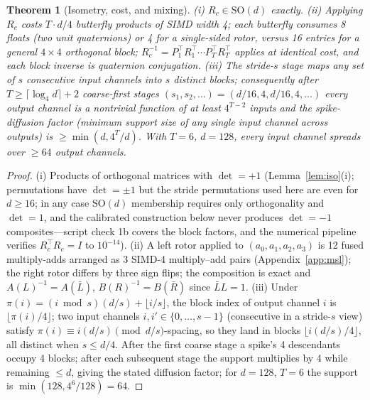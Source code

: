 \documentclass{article}
\newtheorem{theorem}{Theorem}
\newcommand{\SO}{\mathrm{SO}}
\begin{document}
\begin{theorem}[Isometry, cost, and mixing]
\label{thm:mixing}
(i) $R_c\in\SO(d)$ exactly. (ii) Applying $R_c$ costs $T\cdot d/4$ butterfly
products of SIMD width 4; each butterfly consumes 8 floats (two unit
quaternions) or 4 for a single-sided rotor, versus 16 entries for a general
$4\times4$ orthogonal block; $R_c^{-1}=P_1^\top R_1^\top\cdots P_T^\top R_T^\top$
applies at identical cost, and each block inverse is quaternion conjugation.
(iii) The stride-$s$ stage maps any set of $s$ consecutive input channels into
$s$ distinct blocks; consequently after
$T\ge\lceil\log_4 d\rceil+2$ coarse-first stages
$(s_1,s_2,\dots)=(d/16,4,d/16,4,\dots)$ every output channel is a
nontrivial function of at least $4^{T-2}$ inputs and the spike-diffusion
factor (minimum support size of any single input channel across outputs) is
$\ge\min(d,4^{T}/d)$. With $T=6$, $d=128$, every input channel spreads over
$\ge64$ output channels.
\end{theorem}

\begin{proof}
(i) Products of orthogonal matrices with $\det=+1$
(Lemma~\ref{lem:iso}(i); permutations have $\det=\pm1$ but the stride
permutations used here are even for $d\ge16$; in any case $\SO(d)$
membership requires only orthogonality and $\det=1$, and the calibrated
construction below never produces $\det=-1$ composites---script check 1b
covers the block factors, and the numerical pipeline verifies
$R_c^\top R_c=I$ to $10^{-14}$). (ii) A left rotor applied to
$(a_0,a_1,a_2,a_3)$ is 12 fused multiply-adds arranged as 3 SIMD-4
multiply--add pairs (Appendix~\ref{app:msl}); the right rotor differs by
three sign flips; the composition is exact and
$A(L)^{-1}=A(\bar L)$, $B(R)^{-1}=B(\bar R)$ since
$\bar LL=1$. (iii) Under $\pi(i)=(i\bmod s)(d/s)+\lfloor i/s\rfloor$, the
block index of output channel $i$ is $\lfloor\pi(i)/4\rfloor$; two input
channels $i,i'\in\{0,\dots,s-1\}$ (consecutive in a stride-$s$ view) satisfy
$\pi(i)\equiv i(d/s)\pmod{d/s}$-spacing, so they land in blocks
$\lfloor i(d/s)/4\rfloor$, all distinct when $s\le d/4$. After the first
coarse stage a spike's 4 descendants occupy 4 blocks; after each subsequent
stage the support multiplies by 4 while remaining $\le d$, giving the stated
diffusion factor; for $d=128$, $T=6$ the support is
$\min(128,4^{6}/128)=64$.
\end{proof}
\end{document}
